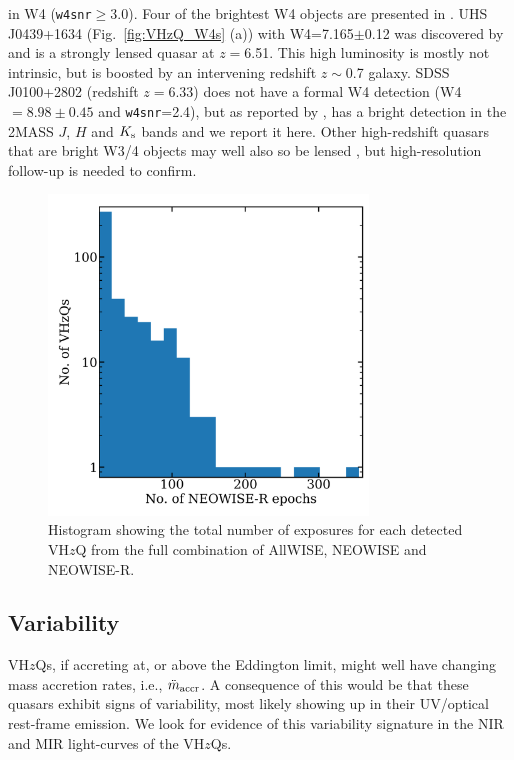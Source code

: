 \documentclass[usenatbib]{mnras}
\begin{document}
in W4 ({\tt w4snr}$\geq$3.0). Four of the brightest W4 objects are
presented in \label{fig:VHzQ_W4s}. UHS J0439+1634
(Fig.~\ref{fig:VHzQ_W4s} (a)) with W4=7.165$\pm$0.12 was discovered by
\citet{Fan2019} and is a strongly lensed quasar at $z=$6.51. This high
luminosity is mostly not intrinsic, but is boosted by an intervening
redshift $z\sim$0.7 galaxy. SDSS J0100+2802 (redshift $z=6.33$) does
not have a formal W4 detection (W4 $=8.98\pm0.45$ and {\tt w4snr}=2.4),
but as reported by \citet{Wu2015}, has a bright detection in the
2MASS $J$, $H$ and $K_{\rm s}$ bands and we report it here.
Other high-redshift quasars that are bright W3/4 objects may well 
also so be lensed \citep[e.g.,][]{Glikman2018lens, Fan2019}, 
but high-resolution follow-up is needed to confirm. 

\begin{figure}
  \centering
  \includegraphics[width=8.5cm]
  {../light_curves/MIR_LCs/NEOWISER_LC_histogramlog_20180827.png}
  \vspace{-16pt}
  \caption[]
  {Histogram showing the total number of exposures for each detected VH$z$Q
    from the full combination of AllWISE, NEOWISE and NEOWISE-R.} 
  \label{fig:MIR_LC_epochs}
\end{figure}
\subsection{Variability}
VH$z$Qs, if accreting at, or above the Eddington limit, might well
have changing mass accretion rates, i.e., $\ddot{m}_{\rm accr}$. A
consequence of this would be that these quasars exhibit signs of
variability, most likely showing up in their UV/optical rest-frame
emission. We look for evidence of this variability signature in the
NIR and MIR light-curves of the VH$z$Qs.
\end{document}
